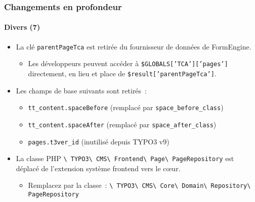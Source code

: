 \begin{frame}[fragile]
	\frametitle{Changements en profondeur}
	\framesubtitle{Divers (7)}

	\begin{itemize}
		\item La clé \texttt{parentPageTca} est retirée du fournisseur de données de FormEngine.

			\begin{itemize}\smaller
				\item[\ding{228}] Les développeurs peuvent accéder à \texttt{\$GLOBALS['TCA']['pages']} directement,
					en lieu et place de \texttt{\$result['parentPageTca']}.
			\end{itemize}\normalsize

		\item Les champs de base suivants sont retirés~:

			\begin{itemize}\smaller
				\item \texttt{tt\_content.spaceBefore} (remplacé par \texttt{space\_before\_class})
				\item \texttt{tt\_content.spaceAfter} (remplacé par \texttt{space\_after\_class})
				\item \texttt{pages.t3ver\_id} (inutilisé depuis TYPO3 v9)
			\end{itemize}\normalsize

		\item La classe PHP
			\texttt{\textbackslash
				TYPO3\textbackslash
				CMS\textbackslash
				Frontend\textbackslash
				Page\textbackslash
				PageRepository} est déplacé de l'extension système frontend vers le cœur.

			\begin{itemize}\smaller
				\item Remplacez par la classe~:
					\texttt{\textbackslash
						TYPO3\textbackslash
						CMS\textbackslash
						Core\textbackslash
						Domain\textbackslash
						Repository\textbackslash
						PageRepository}
			\end{itemize}\normalsize

	\end{itemize}

\end{frame}


